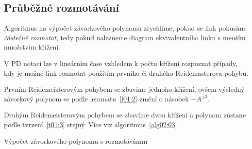 \subsection{Průběžné rozmotávání}
Algoritmus na výpočet závorkového polynomu zrychlíme, pokud se link pokusíme \emph{částečně rozmotat}, tedy pokud nalezneme diagram ekvivalentního linku s menším množstvím křížení. 

V PD notaci lze v lineárním čase vzhledem k počtu křížení rozpoznat případy, kdy je možné link rozmotat použitím prvního či druhého Reidemasterova pohybu.

Prvním Reidemeisterovým pohybem se zbavíme jednoho křížení, ovšem výsledný závorkový polynom se podle lemmatu~\ref{l01:2} změní o násobek $-A^{\pm3}$.

Druhým Reidemeisterovým pohybem se zbavíme dvou křížení a polynom zůstane podle tvrzení~\ref{t01:3} stejný. Více viz algoritmus~\ref{alg02:03}.

\begin{algorithm}[p]
\caption{Výpočet závorkového polynomu s rozmotáváním} 
\label{alg02:03}
\DontPrintSemicolon

%





\end{algorithm}

